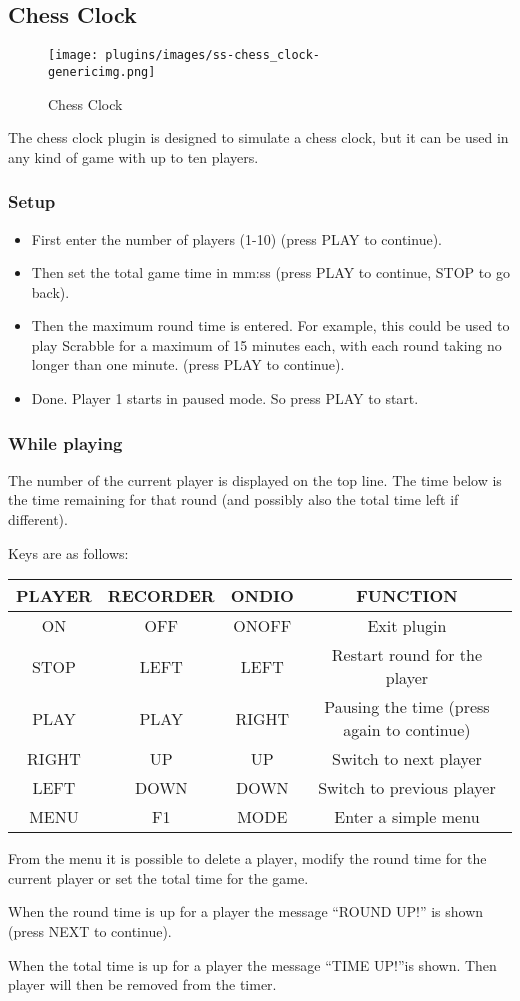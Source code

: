 \subsection{Chess Clock}
\begin{figure}[h!]
\begin{center}
\texttt{[image: plugins/images/ss-chess\_clock-\\genericimg.png]}
\end{center}
\caption{Chess Clock}
\end{figure}

The chess clock plugin is designed  to
simulate a chess clock, but it can be used
in any kind of game with up to ten players.

\subsubsection{Setup}

\begin{itemize}
\item First enter the number of players (1{}-10) (press  PLAY to
continue). 
\item Then set the total game time in mm:ss (press PLAY to continue,
STOP to go back). 
\item Then the maximum round time is entered.  For example, this could
be used  to play Scrabble for a maximum of 15 minutes each, with each
round taking no longer than one minute. (press  PLAY to continue). 
\item Done. Player 1 starts in paused mode. So press PLAY to start.
\end{itemize}

\subsubsection{While playing}
The number of the current player is displayed on the top line. The time
below is the time remaining for that round (and possibly also the total
time left if different). 

Keys are as follows:

\begin{table}[h!]
\begin{center}
\begin{tabular}{|c|c|c|c|}
\hline
PLAYER & RECORDER & ONDIO & FUNCTION \\\hline
ON & OFF & ONOFF & Exit plugin \\\hline
STOP & LEFT & LEFT & Restart round for the player \\\hline
PLAY & PLAY & RIGHT & Pausing the time (press again to continue) \\\hline
RIGHT & UP & UP & Switch to next player \\\hline
LEFT & DOWN & DOWN & Switch to previous player \\\hline
MENU & F1 & MODE & Enter a simple menu \\\hline
\end{tabular}
\end{center}
\end{table}
From the menu it is possible to delete a player, modify the round time
for the current player or set the total time for the game. 

When the round time is up for a player the message ``ROUND UP!'' is shown (press  NEXT to continue). 

When the total time is up for a player the message ``TIME UP!''is shown. Then player will  then be removed from the timer. 


